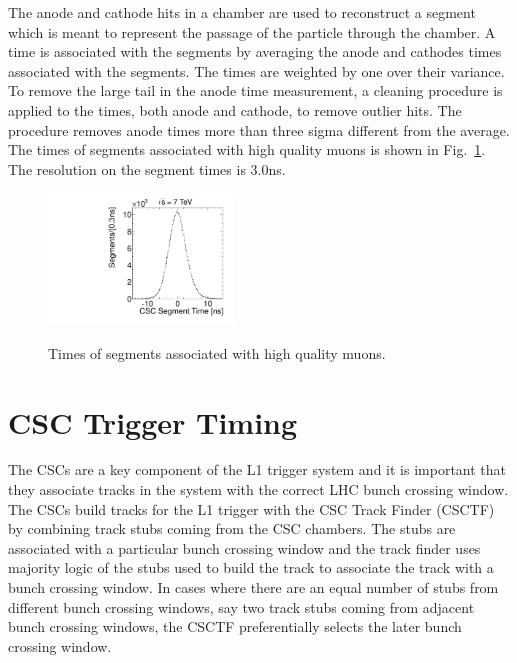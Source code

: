 The anode and cathode hits in a chamber are used to reconstruct a segment which is meant to represent the passage of the particle through the chamber. A time is
associated with the segments by averaging the anode and cathodes times associated with the segments. The times are weighted by one over their variance.
To remove the large tail in the anode time measurement,
a cleaning procedure is applied to the times, both anode and cathode, to remove outlier hits. The procedure removes anode times more than three
sigma different from the average. The times of segments associated with high quality muons is shown in Fig.~\ref{fig:SegTimes}. The resolution on the segment times is 3.0ns.

\begin{figure}
  \begin{center}
      \includegraphics[width=0.44\textwidth]{figures/timing/StripAndWireSegmentTime}
      \renewcommand\baselinestretch{1}\caption[Gluino1200f100 System Pt vs MET]
      {Times of segments associated with high quality muons.
        }
      \renewcommand\baselinestretch{\@spacing}
      \label{fig:SegTimes}
  \end{center}
\end{figure}

\section{CSC Trigger Timing}

The CSCs are a key component of the L1 trigger system and it is important that they associate tracks in the system with the correct LHC bunch crossing window.
The CSCs build tracks for the L1 trigger with the CSC Track Finder (CSCTF) by combining track stubs coming from the CSC chambers. 
The stubs are associated with a particular bunch crossing window and
the track finder uses majority logic of the stubs used to build the track to associate the track with a bunch crossing window. In cases where there are an equal number
of stubs from different bunch crossing windows, say two track stubs coming from adjacent bunch crossing windows, the CSCTF preferentially selects the later bunch crossing window.

